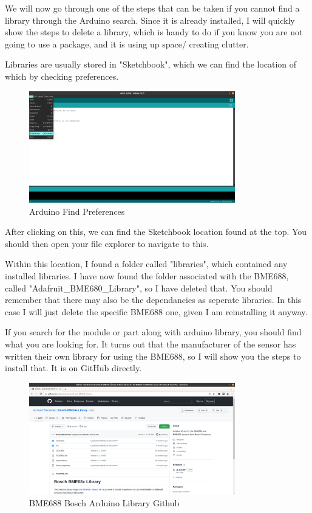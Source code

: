 \documentclass[a4paper,11pt]{report}
\begin{document}
We will now go through one of the steps that can be taken if you cannot find a library through the Arduino search. Since it is already installed, I will quickly show the steps to delete a library, which is handy to do if you know you are not going to use a package, and it is using up space/ creating clutter.

Libraries are usually stored in "Sketchbook", which we can find the location of which by checking preferences.

\begin{figure}[H]
\centering
\includegraphics[width=0.8\textwidth]{screenshots/arduinopreferences}
\caption{Arduino Find Preferences}
\end{figure}

After clicking on this, we can find the Sketchbook location found at the top. You should then open your file explorer to navigate to this.

Within this location, I found a folder called "libraries", which contained any installed libraries. I have now found the folder associated with the BME688, called "Adafruit\_BME680\_Library", so I have deleted that. You should remember that there may also be the dependancies as seperate libraries. In this case I will just delete the specific BME688 one, given I am reinstalling it anyway.

If you search for the module or part along with arduino library, you should find what you are looking for. It turns out that the manufacturer of the sensor has written their own library for using the BME688, so I will show you the steps to install that. It is on GitHub directly.

\begin{figure}[H]
\centering
\includegraphics[width=0.8\textwidth]{screenshots/boscharduinolibrarygithub}
\caption{BME688 Bosch Arduino Library Github}
\end{figure}
\end{document}
